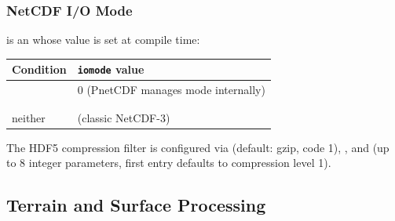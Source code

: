 \subsubsection{NetCDF I/O Mode}

 is an  whose value is set at compile time:

\begin{longtable}{L{5cm} L{9cm}}
  \toprule
  \textbf{Condition} & \textbf{\texttt{iomode} value} \\
  \midrule
  \endhead
  \bottomrule
  \endfoot
                & 0 (PnetCDF manages mode internally) \\
          &  \\
           &  \\
  neither                     &  (classic NetCDF-3) \\
\end{longtable}

The HDF5 compression filter is configured via  (default:
gzip, code 1), , and 
(up to 8 integer parameters, first entry defaults to compression level 1).

\subsection{Terrain and Surface Processing}
\label{subsec:dynparam_terrain}


